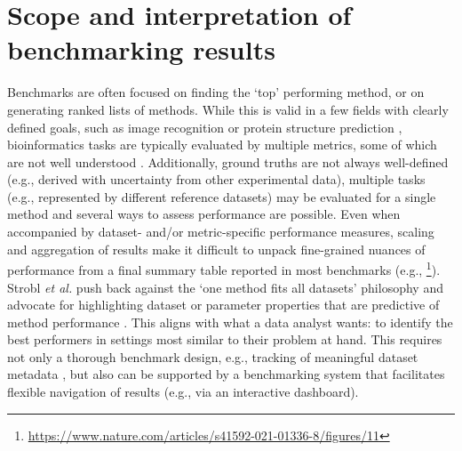 \documentclass[11pt]{article}
\begin{document}
\section*{Scope and interpretation of benchmarking results}

Benchmarks are often focused on finding the `top' performing method, or on generating ranked lists of methods. While this is valid in a few fields with clearly defined goals, such as image recognition \cite{Khan2018-ot} or protein structure prediction \cite{Jumper2021-oq}, bioinformatics tasks are typically evaluated by multiple metrics, some of which are not well understood \cite{Lutge2021-mt, Reinke2024-dw}. Additionally, ground truths are not always well-defined (e.g., derived with uncertainty from other experimental data), multiple tasks (e.g., represented by different reference datasets) may be evaluated for a single method and several ways to assess performance are possible. Even when accompanied by dataset- and/or metric-specific performance measures, scaling and aggregation of results make it difficult to unpack fine-grained nuances of performance from a final summary table reported in most benchmarks (e.g., \footnote{\url{https://www.nature.com/articles/s41592-021-01336-8/figures/11}}). Strobl \textit{et al.} push back against the `one method fits all datasets’ philosophy and advocate for highlighting dataset or parameter properties that are predictive of method performance \cite{Jelizarow2010-kr, Boulesteix2010-zj, Strobl2024-lp}. This aligns with what a data analyst wants: to identify the best performers in settings most similar to their problem at hand. This requires not only a thorough benchmark design, e.g., tracking of meaningful dataset metadata \cite{Strobl2024-lp}, but also can be supported by a benchmarking system that facilitates flexible navigation of results (e.g., via an interactive dashboard). 
\end{document}
